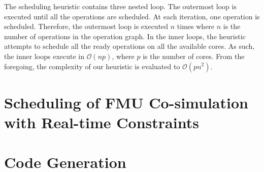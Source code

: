 The scheduling heuristic contains three nested loop. The outermost loop is executed until all the operations are scheduled. At each iteration, one operation is scheduled. Therefore, the outermost loop is executed $n$ times where $n$ is the number of operations in the operation graph. In the inner loops, the heuristic attempts to schedule all the ready operations on all the available cores. As such, the inner loops execute in $\mathcal{O}(np)$, where $p$ is the number of cores. From the foregoing, the complexity of our heuristic is evaluated to $\mathcal{O}(pn^2)$.

\section{Scheduling of FMU Co-simulation with Real-time Constraints}

\section{Code Generation}


